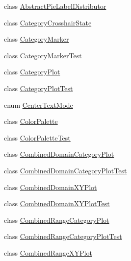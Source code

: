 \begin{DoxyCompactItemize}
\item 
class \mbox{\hyperlink{classorg_1_1jfree_1_1chart_1_1plot_1_1_abstract_pie_label_distributor}{Abstract\+Pie\+Label\+Distributor}}
\item 
class \mbox{\hyperlink{classorg_1_1jfree_1_1chart_1_1plot_1_1_category_crosshair_state}{Category\+Crosshair\+State}}
\item 
class \mbox{\hyperlink{classorg_1_1jfree_1_1chart_1_1plot_1_1_category_marker}{Category\+Marker}}
\item 
class \mbox{\hyperlink{classorg_1_1jfree_1_1chart_1_1plot_1_1_category_marker_test}{Category\+Marker\+Test}}
\item 
class \mbox{\hyperlink{classorg_1_1jfree_1_1chart_1_1plot_1_1_category_plot}{Category\+Plot}}
\item 
class \mbox{\hyperlink{classorg_1_1jfree_1_1chart_1_1plot_1_1_category_plot_test}{Category\+Plot\+Test}}
\item 
enum \mbox{\hyperlink{enumorg_1_1jfree_1_1chart_1_1plot_1_1_center_text_mode}{Center\+Text\+Mode}}
\item 
class \mbox{\hyperlink{classorg_1_1jfree_1_1chart_1_1plot_1_1_color_palette}{Color\+Palette}}
\item 
class \mbox{\hyperlink{classorg_1_1jfree_1_1chart_1_1plot_1_1_color_palette_test}{Color\+Palette\+Test}}
\item 
class \mbox{\hyperlink{classorg_1_1jfree_1_1chart_1_1plot_1_1_combined_domain_category_plot}{Combined\+Domain\+Category\+Plot}}
\item 
class \mbox{\hyperlink{classorg_1_1jfree_1_1chart_1_1plot_1_1_combined_domain_category_plot_test}{Combined\+Domain\+Category\+Plot\+Test}}
\item 
class \mbox{\hyperlink{classorg_1_1jfree_1_1chart_1_1plot_1_1_combined_domain_x_y_plot}{Combined\+Domain\+X\+Y\+Plot}}
\item 
class \mbox{\hyperlink{classorg_1_1jfree_1_1chart_1_1plot_1_1_combined_domain_x_y_plot_test}{Combined\+Domain\+X\+Y\+Plot\+Test}}
\item 
class \mbox{\hyperlink{classorg_1_1jfree_1_1chart_1_1plot_1_1_combined_range_category_plot}{Combined\+Range\+Category\+Plot}}
\item 
class \mbox{\hyperlink{classorg_1_1jfree_1_1chart_1_1plot_1_1_combined_range_category_plot_test}{Combined\+Range\+Category\+Plot\+Test}}
\item 
class \mbox{\hyperlink{classorg_1_1jfree_1_1chart_1_1plot_1_1_combined_range_x_y_plot}{Combined\+Range\+X\+Y\+Plot}}

\end{DoxyCompactItemize}
